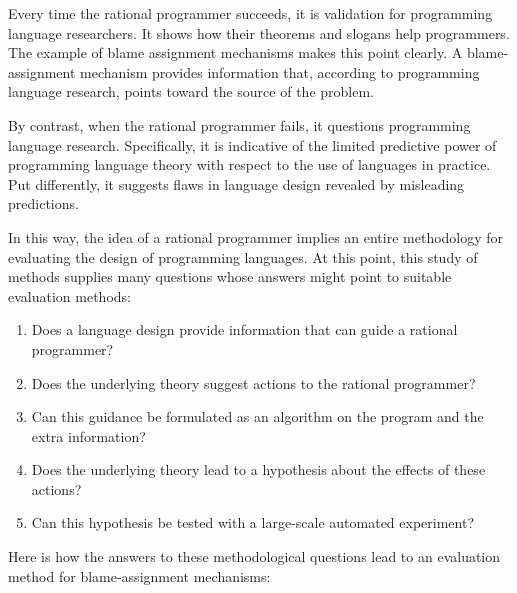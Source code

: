 

Every time the rational programmer succeeds, it is validation for programming
language researchers. It shows how their theorems and slogans help
programmers. The example of blame assignment mechanisms makes this point
clearly. A blame-assignment mechanism provides information that, according to
programming language research, points toward the source of the problem.

By contrast, when the rational programmer fails, it questions programming
language research. Specifically, it is indicative of the limited predictive
power of programming language theory with respect to the use of languages in
practice. Put differently, it suggests flaws in language design revealed by
misleading predictions.

In this way, the idea of a rational programmer implies an entire methodology for
evaluating the design of programming languages. At this point, this study of
methods supplies many questions whose answers might point to suitable evaluation
methods: 

\begin{enumerate} 

\item Does a language design provide information that can guide a
 rational programmer?

\item Does the underlying theory suggest actions to the rational programmer?

\item Can this guidance be formulated as an algorithm on the program and the extra
information?

\item Does the underlying theory lead to a hypothesis about the effects of
 these actions? 

\item Can this hypothesis be tested with a large-scale automated experiment?

\end{enumerate}

Here is how the answers to these methodological questions lead to an evaluation
method for blame-assignment mechanisms: 

